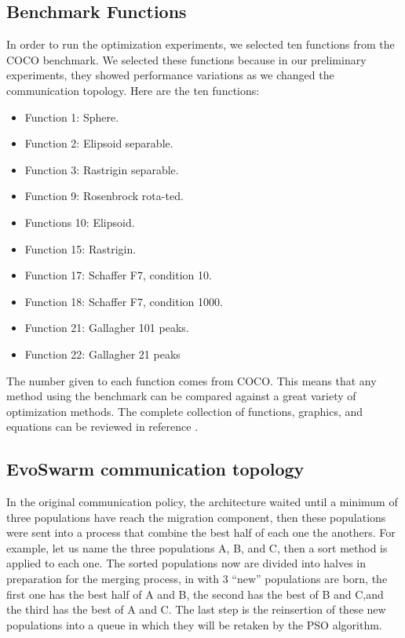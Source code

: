 \documentclass[runningheads]{llncs}
\begin{document}
\subsection{Benchmark Functions}
In order to run the optimization experiments, we selected ten functions from the COCO benchmark. We selected these functions because in our preliminary experiments, they showed performance variations as we changed the communication topology. Here are the ten functions:
\begin{multicols}{2}
\begin{itemize}

    \item Function 1: Sphere.
    \item Function 2: Elipsoid separable.
    \item Function 3: Rastrigin separable.
    \item Function 9: Rosenbrock rota-ted.
    \item Functions 10: Elipsoid.
    \item Function 15: Rastrigin.
    \item Function 17: Schaffer F7, condition 10.
    \item Function 18: Schaffer F7, condition 1000.
    \item Function 21: Gallagher 101 peaks.
    \item Function 22: Gallagher 21 peaks

\end{itemize}
\end{multicols}

The number given to each function comes from COCO. This means that any method using the benchmark can be compared against a great variety of optimization methods. The complete collection of functions, graphics, and equations can be reviewed in reference \cite{bbob}.

\subsection{EvoSwarm communication topology}
In the original communication policy, the architecture waited until a minimum of three populations have reach the migration component, then these populations were sent into a process that combine the best half of each one the anothers. For example, let us name the three populations A, B, and C, then a sort method is applied to each one. The sorted populations now are divided into halves in preparation for the merging process, in with 3 “new” populations are born, the first one has the best half of A and B, the second has the best of B and C,and the third has the best of A and C. The last step is the reinsertion of these new populations into a queue in which they will be retaken by the PSO algorithm.
\end{document}

